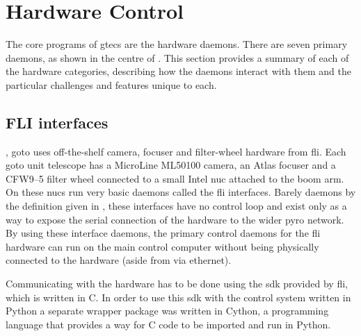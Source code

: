 \section{Hardware Control}
\label{sec:hardware_control}
\begin{colsection}


\begin{colsection}

The core programs of \gls{gtecs} are the hardware daemons. There are seven primary daemons, as shown in the centre of . This section provides a summary of each of the hardware categories, describing how the daemons interact with them and the particular challenges and features unique to each.

\end{colsection}


\subsection{FLI interfaces}
\label{sec:fli}
\begin{colsection}

, \gls{goto} uses off-the-shelf camera, focuser and filter-wheel hardware from \gls{fli}. Each \gls{goto} unit telescope has a MicroLine ML50100 camera, an Atlas focuser and a CFW9--5 filter wheel connected to a small Intel \gls{nuc} attached to the boom arm. On these \glspl{nuc} run very basic daemons called the \gls{fli} interfaces. Barely daemons by the definition given in , these interfaces have no control loop and exist only as a way to expose the serial connection of the hardware to the wider \gls{pyro} network. By using these interface daemons, the primary control daemons for the \gls{fli} hardware can run on the main control computer without being physically connected to the hardware (aside from via ethernet).

Communicating with the hardware has to be done using the \gls{sdk} provided by \gls{fli}, which is written in C. In order to use this \gls{sdk} with the control system written in Python a separate wrapper package  was written in Cython, a programming language that provides a way for C code to be imported and run in Python.


\end{colsection}
\end{colsection}
